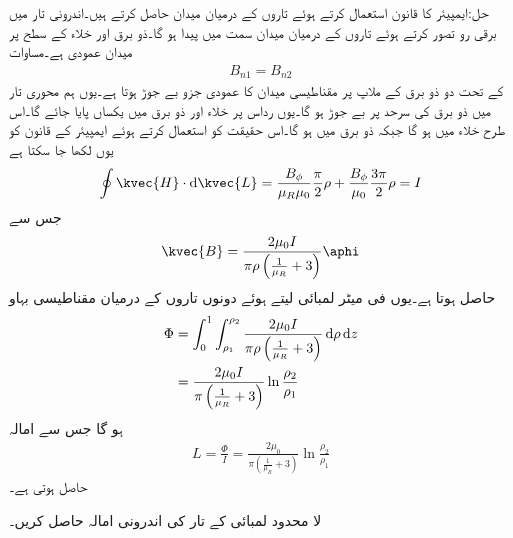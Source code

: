 حل:ایمپیئر کا قانون استعمال کرتے ہوئے تاروں کے درمیان میدان حاصل کرتے ہیں۔اندرونی تار میں برقی رو  تصور کرتے ہوئے تاروں کے درمیان میدان  سمت میں پیدا ہو گا۔ذو برق اور خلاء کے سطح پر میدان عمودی ہے۔مساوات 
\begin{align*}
B_{n1}=B_{n2}
\end{align*}
 کے تحت دو ذو برق کے ملاپ پر مقناطیسی میدان کا عمودی جزو بے جوڑ ہوتا ہے۔یوں ہم محوری تار میں ذو برق کی سرحد پر  بے جوڑ ہو گا۔یوں رداس  پر خلاء اور ذو برق میں یکساں  پایا جائے گا۔اس طرح خلاء میں  ہو گا جبکہ ذو برق میں  ہو گا۔اس حقیقت کو استعمال کرتے ہوئے ایمپیئر کے قانون کو یوں لکھا جا سکتا ہے
\begin{align*}
\oint \kvec{H} \cdot \dif \kvec{L}=\frac{B_{\phi}}{\mu_R \mu_0} \frac{\pi}{2} \rho+\frac{B_{\phi}}{\mu_0} \frac{3\pi}{2} \rho=I
\end{align*} 
جس سے 
\begin{align*}
\kvec{B}=\frac{2\mu_0 I}{\pi \rho \left(\frac{1}{\mu_R}+3\right)} \aphi
\end{align*}
حاصل ہوتا ہے۔یوں فی میٹر لمبائی لیتے ہوئے دونوں تاروں کے درمیان مقناطیسی بہاو
\begin{align*}
\Phi&=\int_0^{1} \int_{\rho_1}^{\rho_2} \frac{2\mu_0 I}{\pi \rho \left(\frac{1}{\mu_R}+3\right)} \dif \rho \dif z\\
&=\frac{2\mu_0 I}{\pi  \left(\frac{1}{\mu_R}+3\right)} \ln \frac{\rho_2}{\rho_1}
\end{align*}
ہو گا جس سے امالہ
\begin{align*}
L=\frac{\Phi}{I}=\frac{2\mu_0}{\pi  \left(\frac{1}{\mu_R}+3\right)} \ln \frac{\rho_2}{\rho_1}
\end{align*}
حاصل ہوتی ہے۔

لا محدود لمبائی کے تار کی اندرونی امالہ حاصل کریں۔

